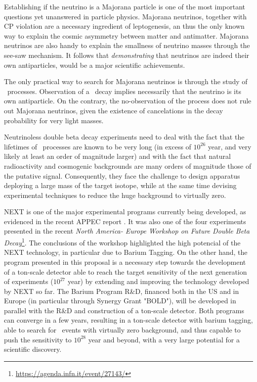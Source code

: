 

Establishing if the neutrino is a Majorana particle is one of the most important questions yet unanswered in particle physics. Majorana neutrinos, together with CP violation are a necessary ingredient of leptogenesis, an thus the only known way to explain the cosmic asymmetry between matter and antimatter. Majorana neutrinos are also handy to explain the smallness of neutrino masses through the see-saw mechanism. It follows that {\em demonstrating} that neutrinos are indeed their own antiparticles, would be a major scientific achievements.

The only practical way to search for Majorana neutrinos is through the study of \bbonu\ processes. Observation of a \bbonu\ decay implies necessarily that the neutrino is its own antiparticle. On the contrary, the no-observation of the process does not rule out Majorana neutrinos, given the existence of cancelations in the decay probability for very light masses. 

Neutrinoless double beta decay experiments need to deal with the fact that the lifetimes of \bbonu\ processes are known to be very long (in excess of $10^{26}$ year, and very likely at least an order of magnitude larger) and with the fact that natural radioactivity and cosmogenic backgrounds are many orders of magnitude those of the putative signal. Consequently, they face the challenge to design apparatus deploying a large mass of the target isotope, while at the same time devising experimental techniques to reduce the huge background to virtually zero. 

NEXT is one of the major experimental programs currently being developed, as evidenced in the recent APPEC report \cite{Giuliani:2019uno}. It was also one of the four experiments presented in the recent {\it North America- Europe Workshop on Future Double Beta Decay}\footnote{\url{https://agenda.infn.it/event/27143/}}. The conclusions of the workshop highlighted the high potencial of the NEXT technology, in particular due to Barium Tagging. On the other hand, the program presented in this proposal is a necessary step towards the development of a ton-scale detector able to reach the target sensitivity of the next generation of experiments
($10^{27}$ year) by extending and improving the technology developed by NEXT so far. The Barium Program R\&D, financed both in the US and in Europe (in particular through Synergy Grant "BOLD"), will be developed in parallel with the R\&D and construction of a ton-scale detector. Both programs can converge in a few years, resulting in a ton-scale detector with barium tagging, able to search for \bbonu\ events with virtually zero background, and thus capable to push the sensitivity to  $10^{28}$ year and beyond, with a very large potential for a scientific discovery.

